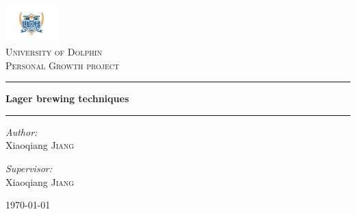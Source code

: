 \begin{titlepage}

\begin{center}


\includegraphics[width=0.15\textwidth]{./logo}\\[1cm]    

\textsc{\LARGE University of Dolphin}\\[1.5cm]

\textsc{\Large Personal Growth project}\\[0.5cm]

\hrule%

{ \huge \bfseries Lager brewing techniques}\\[0.4cm]

\hrule

\begin{minipage}{0.4\textwidth}
\begin{flushleft} \large
\emph{Author:}\\
Xiaoqiang \textsc{Jiang}
\end{flushleft}
\end{minipage}
\begin{minipage}{0.4\textwidth}
\begin{flushright} \large
\emph{Supervisor:} \\
Xiaoqiang \textsc{Jiang}
\end{flushright}
\end{minipage}

\vfill

{\large \today}

\end{center}

\end{titlepage}